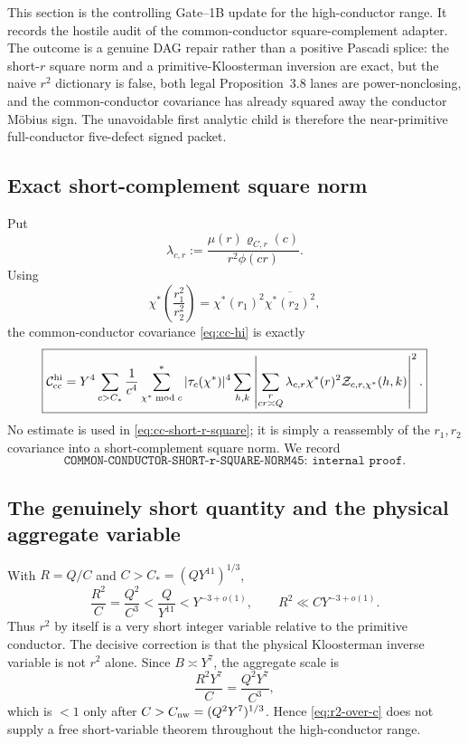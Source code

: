 \documentclass[11pt]{article}
\theoremstyle{definition}
\newcommand{\1}{\mathbf 1}
\begin{document}
This section is the controlling Gate--1B update for the high-conductor range.
It records the hostile audit of the common-conductor square-complement adapter.
The outcome is a genuine DAG repair rather than a positive Pascadi splice:
the short-$r$ square norm and a primitive-Kloosterman inversion are exact, but
the naive $r^2$ dictionary is false, both legal Proposition~3.8 lanes are
power-nonclosing, and the common-conductor covariance has already squared away
the conductor M\"obius sign.  The unavoidable first analytic child is therefore
the near-primitive full-conductor five-defect signed packet.

\subsection{Exact short-complement square norm}

Put
\[
 \lambda_{c,r}:=\frac{\mu(r)\varrho_{C,r}(c)}{r^2\phi(cr)}.
\]
Using
\[
 \chi^*\!\left(\frac{r_1^2}{r_2^2}\right)
 =\chi^*(r_1)^2\overline{\chi^*(r_2)^2},
\]
the common-conductor covariance \eqref{eq:cc-hi} is exactly
\begin{equation}
\boxed{
\begin{aligned}
 \mathcal C_{\rm cc}^{\rm hi}
 =Y^4\sum_{c>C_*}\frac1{c^4}
 \sum_{\chi^*\bmod c}^{*}|\tau_c(\chi^*)|^4
 \sum_{h,k}
 \left|
   \sum_{\substack{r\\cr\asymp Q}}
      \lambda_{c,r}\chi^*(r)^2
      \mathcal Z_{c,r,\chi^*}(h,k)
 \right|^2.
\end{aligned}}
\label{eq:cc-short-r-square}
\end{equation}
No estimate is used in \eqref{eq:cc-short-r-square}; it is simply a reassembly
of the $r_1,r_2$ covariance into a short-complement square norm.  We record
\[
 \boxed{\texttt{COMMON-CONDUCTOR-SHORT-r-SQUARE-NORM45: internal proof}.}
\]

\subsection{The genuinely short quantity and the physical aggregate variable}

With $R=Q/C$ and $C>C_*=(QY^{11})^{1/3}$,
\begin{equation}
 \frac{R^2}{C}=\frac{Q^2}{C^3}<\frac{Q}{Y^{11}}
 <Y^{-3+o(1)},
 \qquad
 R^2\ll CY^{-3+o(1)}.
 \label{eq:r2-over-c}
\end{equation}
Thus $r^2$ by itself is a very short integer variable relative to the primitive
conductor.  The decisive correction is that the physical Kloosterman inverse
variable is not $r^2$ alone.  Since $B\asymp Y^7$, the aggregate scale is
\begin{equation}
 \frac{R^2Y^7}{C}=\frac{Q^2Y^7}{C^3},
 \label{eq:r2B-scale}
\end{equation}
which is $<1$ only after $C>C_{\rm nw}=(Q^2Y^7)^{1/3}$.  Hence
\eqref{eq:r2-over-c} does not supply a free short-variable theorem throughout
the high-conductor range.
\end{document}
